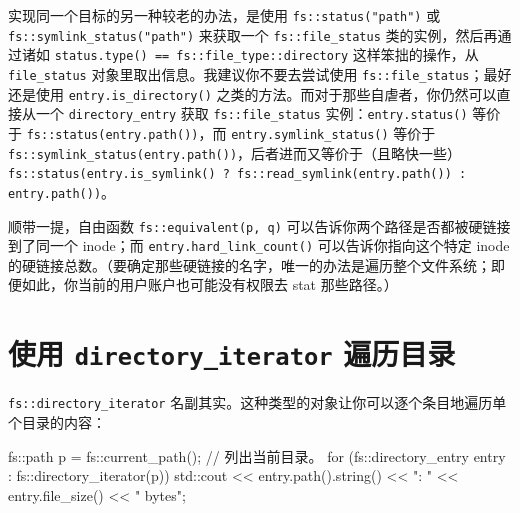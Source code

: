 实现同一个目标的另一种较老的办法，是使用 \texttt{fs::\allowbreak{}status(\allowbreak{}"path")\allowbreak{}} 或 \texttt{fs::\allowbreak{}symlink\_\allowbreak{}status(\allowbreak{}"path")\allowbreak{}} 来获取一个 \texttt{fs::\allowbreak{}file\_\allowbreak{}status} 类的实例，然后再通过诸如 \texttt{status.\allowbreak{}type(\allowbreak{})\allowbreak{} == fs::\allowbreak{}file\_\allowbreak{}type::\allowbreak{}directory} 这样笨拙的操作，从 \texttt{file\_\allowbreak{}status} 对象里取出信息。我建议你不要去尝试使用 \texttt{fs::\allowbreak{}file\_\allowbreak{}status}；最好还是使用 \texttt{entry.\allowbreak{}is\_\allowbreak{}directory(\allowbreak{})\allowbreak{}} 之类的方法。而对于那些自虐者，你仍然可以直接从一个 \texttt{directory\_\allowbreak{}entry} 获取 \texttt{fs::\allowbreak{}file\_\allowbreak{}status} 实例：\texttt{entry.\allowbreak{}status(\allowbreak{})\allowbreak{}} 等价于 \texttt{fs::\allowbreak{}status(\allowbreak{}entry.\allowbreak{}path(\allowbreak{})\allowbreak{})\allowbreak{}}，而 \texttt{entry.\allowbreak{}symlink\_\allowbreak{}status(\allowbreak{})\allowbreak{}} 等价于 \texttt{fs::\allowbreak{}symlink\_\allowbreak{}status(\allowbreak{}entry.\allowbreak{}path(\allowbreak{})\allowbreak{})\allowbreak{}}，后者进而又等价于（且略快一些）\texttt{fs::\allowbreak{}status(\allowbreak{}entry.\allowbreak{}is\_\allowbreak{}symlink(\allowbreak{})\allowbreak{} ? fs::\allowbreak{}read\_\allowbreak{}symlink(\allowbreak{}entry.\allowbreak{}path(\allowbreak{})\allowbreak{})\allowbreak{} : entry.\allowbreak{}path(\allowbreak{})\allowbreak{})\allowbreak{}}。

顺带一提，自由函数 \texttt{fs::\allowbreak{}equivalent(\allowbreak{}p,\allowbreak{} q)\allowbreak{}} 可以告诉你两个路径是否都被硬链接到了同一个 inode；而 \texttt{entry.\allowbreak{}hard\_\allowbreak{}link\_\allowbreak{}count(\allowbreak{})\allowbreak{}} 可以告诉你指向这个特定 inode 的硬链接总数。（要确定那些硬链接的名字，唯一的办法是遍历整个文件系统；即便如此，你当前的用户账户也可能没有权限去 stat 那些路径。）

\section{使用 \texttt{directory\_\allowbreak{}iterator} 遍历目录}

\texttt{fs::\allowbreak{}directory\_\allowbreak{}iterator} 名副其实。这种类型的对象让你可以逐个条目地遍历单个目录的内容：

\begin{codebox}[cpp]
    fs::path p = fs::current_path();
      // 列出当前目录。
    for (fs::directory_entry entry : fs::directory_iterator(p)) {
      std::cout << entry.path().string() << ": "
      << entry.file_size() << " bytes\n";
    }
\end{codebox}

